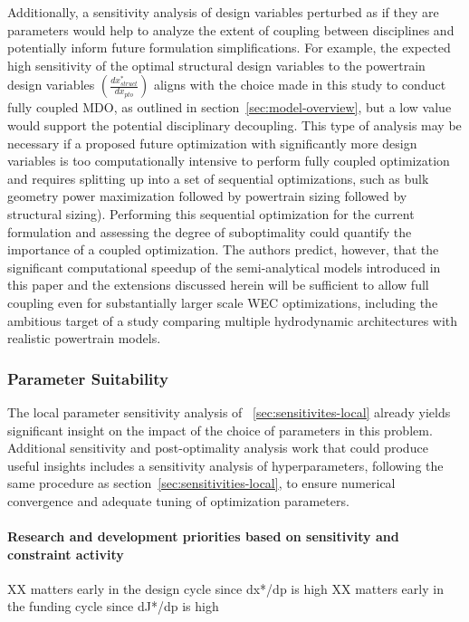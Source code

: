 Additionally, a sensitivity analysis of design variables perturbed as if they are parameters would help to analyze the extent of coupling between disciplines and potentially inform future formulation simplifications.
For example, the expected high sensitivity of the optimal structural design variables to the powertrain design variables $\left(\frac{dx^*_{struct}}{dx_{pto}}\right)$ aligns with the choice made in this study to conduct fully coupled MDO, as outlined in section~\ref{sec:model-overview}, but a low value would support the potential disciplinary decoupling.
This type of analysis may be necessary if a proposed future optimization with significantly more design variables is too computationally intensive to perform fully coupled optimization and requires splitting up into a set of sequential optimizations, such as bulk geometry power maximization followed by powertrain sizing followed by structural sizing).
Performing this sequential optimization for the current formulation and assessing the degree of suboptimality could quantify the importance of a coupled optimization.
The authors predict, however, that the significant computational speedup of the semi-analytical models introduced in this paper and the extensions discussed herein will be sufficient to allow full coupling even for substantially larger scale WEC optimizations, including the ambitious target of a study comparing multiple hydrodynamic architectures with realistic powertrain models.

\subsubsection{Parameter Suitability}
The local parameter sensitivity analysis of \sectionautorefname~\ref{sec:sensitivites-local} already yields significant insight on the impact of the choice of parameters in this problem.
Additional sensitivity and post-optimality analysis work that could produce useful insights includes a sensitivity analysis of hyperparameters, following the same procedure as section~\ref{sec:sensitivities-local}, to ensure numerical convergence and adequate tuning of optimization parameters.

\paragraph{Research and development priorities based on sensitivity and constraint activity}
XX matters early in the design cycle since dx*/dp is high
XX matters early in the funding cycle since dJ*/dp is high

